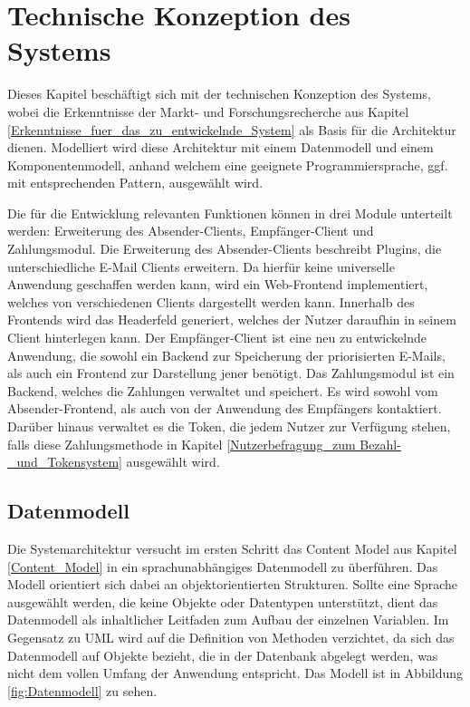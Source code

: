 
\chapter{Technische Konzeption des Systems}
\label{Technische_Konzeption_des_Systems}

Dieses Kapitel beschäftigt sich mit der technischen Konzeption des Systems, wobei die Erkenntnisse der Markt- und Forschungsrecherche aus Kapitel \ref{Erkenntnisse_fuer_das_zu_entwickelnde_System} als Basis für die Architektur dienen. Modelliert wird diese Architektur mit einem Datenmodell und einem Komponentenmodell, anhand welchem eine geeignete Programmiersprache, ggf. mit entsprechenden Pattern, ausgewählt wird.

Die für die Entwicklung relevanten Funktionen können in drei Module unterteilt werden: Erweiterung des Absender-Clients, Empfänger-Client und Zahlungsmodul. Die Erweiterung des Absender-Clients beschreibt Plugins, die unterschiedliche E-Mail Clients erweitern. Da hierfür keine universelle Anwendung geschaffen werden kann, wird ein Web-Frontend implementiert, welches von verschiedenen Clients dargestellt werden kann. Innerhalb des Frontends wird das Headerfeld generiert, welches der Nutzer daraufhin in seinem Client hinterlegen kann. Der Empfänger-Client ist eine neu zu entwickelnde Anwendung, die sowohl ein Backend zur Speicherung der priorisierten E-Mails, als auch ein Frontend zur Darstellung jener benötigt. Das Zahlungsmodul ist ein Backend, welches die Zahlungen verwaltet und speichert. Es wird sowohl vom Absender-Frontend, als auch von der Anwendung des Empfängers kontaktiert. Darüber hinaus verwaltet es die Token, die jedem Nutzer zur Verfügung stehen, falls diese Zahlungsmethode in Kapitel \ref{Nutzerbefragung_zum Bezahl-_und_Tokensystem} ausgewählt wird.

\section{Datenmodell}
\label{Datenmodell}
Die Systemarchitektur versucht im ersten Schritt das Content Model aus Kapitel \ref{Content_Model} in ein sprachunabhängiges Datenmodell zu überführen. Das Modell orientiert sich dabei an objektorientierten Strukturen. Sollte eine Sprache ausgewählt werden, die keine Objekte oder Datentypen unterstützt, dient das Datenmodell als inhaltlicher Leitfaden zum Aufbau der einzelnen Variablen. Im Gegensatz zu UML wird auf die Definition von Methoden verzichtet, da sich das Datenmodell auf Objekte bezieht, die in der Datenbank abgelegt werden, was nicht dem vollen Umfang der Anwendung entspricht. Das Modell ist in Abbildung \ref{fig:Datenmodell} zu sehen.

